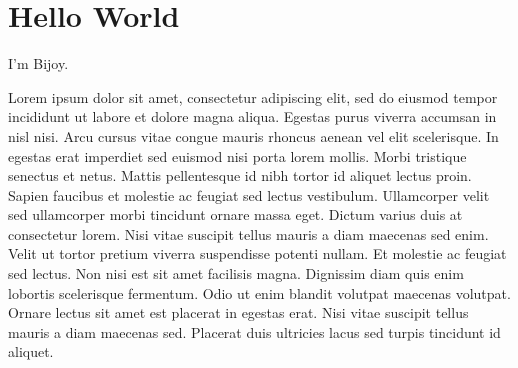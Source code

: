 \documentclass{article}
\begin{document}
\section{Hello World} 

I'm Bijoy.

Lorem ipsum dolor sit amet, consectetur adipiscing elit, sed do eiusmod tempor incididunt ut labore et dolore magna aliqua. Egestas purus viverra accumsan in nisl nisi. Arcu cursus vitae congue mauris rhoncus aenean vel elit scelerisque. In egestas erat imperdiet sed euismod nisi porta lorem mollis. Morbi tristique senectus et netus. Mattis pellentesque id nibh tortor id aliquet lectus proin. Sapien faucibus et molestie ac feugiat sed lectus vestibulum. Ullamcorper velit sed ullamcorper morbi tincidunt ornare massa eget. Dictum varius duis at consectetur lorem. Nisi vitae suscipit tellus mauris a diam maecenas sed enim. Velit ut tortor pretium viverra suspendisse potenti nullam. Et molestie ac feugiat sed lectus. Non nisi est sit amet facilisis magna. Dignissim diam quis enim lobortis scelerisque fermentum. Odio ut enim blandit volutpat maecenas volutpat. Ornare lectus sit amet est placerat in egestas erat. Nisi vitae suscipit tellus mauris a diam maecenas sed. Placerat duis ultricies lacus sed turpis tincidunt id aliquet.
\end{document}
